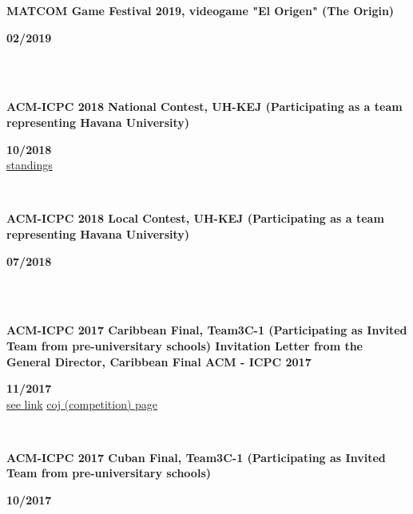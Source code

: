 \documentclass{article}
\begin{document}
\begin{minipage}{0.8\textwidth}
    \parbox{0.8\linewidth}{\textbf{MATCOM Game Festival 2019, videogame "El Origen" (The Origin)
    }} \hfill \textbf{02/2019}\\
    \\
\end{minipage}\\
\begin{minipage}{0.8\textwidth}
    \parbox{0.8\linewidth}{\textbf{ACM-ICPC 2018 National Contest, UH-KEJ (Participating as a team representing Havana University)} }\hfill \textbf{10/2018}\\
    \href{https://icpc.global/regionals/finder/cnc-2018/standings}{standings}
    \\
\end{minipage} \hfill {}\\
\begin{minipage}{0.8\textwidth}
    \parbox{0.8\linewidth}{\textbf{ACM-ICPC 2018 Local Contest, UH-KEJ  (Participating as a team representing Havana University)}} \hfill \textbf{07/2018}\\
    \\
\end{minipage} \hfill {}\\
\begin{minipage}{0.8\textwidth}
    \parbox{0.8\linewidth}{\textbf{ACM-ICPC 2017 Caribbean Final, Team3C-1 (Participating as  Invited Team from pre-universitary schools)
    Invitation Letter from the General Director, Caribbean Final ACM - ICPC 2017}} \hfill \textbf{11/2017}\\
    \href{https://matcomgrader.com/post/5167/the-2017-acm-icpc-caribbean-finals}{see link}
    \href{https://coj-forum.uci.cu/viewtopic.php?t=3315}{coj (competition) page}
    \\
\end{minipage} \hfill {}\\
\begin{minipage}{0.8\textwidth}
    \parbox{0.8\linewidth}{\textbf{ACM-ICPC 2017 Cuban Final, Team3C-1 (Participating as  Invited Team from pre-universitary schools)}} \hfill \textbf{10/2017}\\
    \\
\end{minipage}\\
\end{document}
